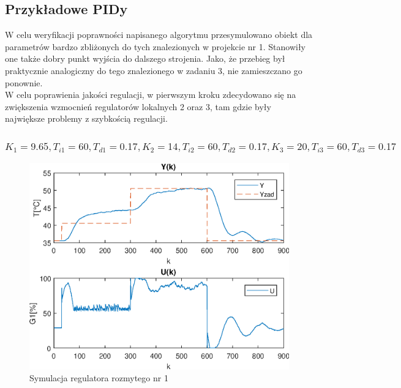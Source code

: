 \subsection{Przykładowe PIDy}

W celu weryfikacji poprawności napisanego algorytmu przesymulowano obiekt dla parametrów bardzo zbliżonych do tych znalezionych w projekcie nr 1. Stanowiły one także dobry punkt wyjścia do dalszego strojenia. Jako, że przebieg był praktycznie analogiczny do tego znalezionego w zadaniu 3, nie zamieszczano go ponownie.\\

W celu poprawienia jakości regulacji, w pierwszym kroku zdecydowano się na zwiększenia wzmocnień regulatorów lokalnych 2 oraz 3, tam gdzie były największe problemy z szybkością regulacji.

\subsubsection{$K_{1}=\num{9,65},T_{i1}=\num{60},T_{d1}=\num{0,17}, K_{2}=\num{14},T_{i2}=\num{60},T_{d2}=\num{0,17}, K_{3}=\num{20},T_{i3}=\num{60},T_{d3}=\num{0,17}$ }




\begin{figure}[h!]
	\centering
	\includegraphics[scale=1]{Rys/PID2.eps}
	\caption{Symulacja regulatora rozmytego nr 1}
	\label{pid2}
\end{figure}


